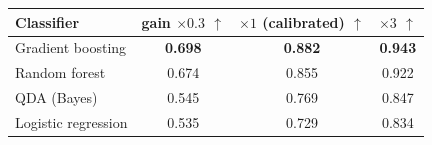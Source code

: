 \begin{tabular}{lccc}
\toprule
Classifier & gain $\times0.3$ $\uparrow$ & $\times1$ (calibrated) $\uparrow$ & $\times3$ $\uparrow$ \\
\midrule
Gradient boosting & \cellcolor{gray!20}\textbf{0.698} & \cellcolor{gray!20}\textbf{0.882} & \cellcolor{gray!20}\textbf{0.943} \\
Random forest & 0.674 & 0.855 & 0.922 \\
QDA (Bayes) & 0.545 & 0.769 & 0.847 \\
Logistic regression & 0.535 & 0.729 & 0.834 \\
\bottomrule
\end{tabular}
